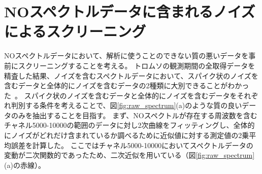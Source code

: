 \section{NOスペクトルデータに含まれるノイズによるスクリーニング}
\label{sec:screening_spectralnoise}

NOスペクトルデータにおいて、解析に使うことのできない質の悪いデータを事前にスクリーニングすることを考える。
トロムソの観測期間の全取得データを精査した結果、ノイズを含むスペクトルデータにおいて、スパイク状のノイズを含むデータと全体的にノイズを含むデータの2種類に大別できることがわかった~\cite{goto2021bachelor}。
スパイク状のノイズを含むデータと全体的にノイズを含むデータをそれぞれ判別する条件を考えることで、図\ref{fig:raw_spectrum}(a)のような質の良いデータのみを抽出することを目指す。
まず、NOスペクトルが存在する周波数を含むチャネル5000-10000の範囲のデータに対し2次曲線をフィッティングし、全体的にノイズがどれだけ含まれているか調べるために近似値に対する測定値の2乗平均誤差を計算した。
ここではチャネル5000-10000においてスペクトルデータの変動が二次関数的であったため、二次近似を用いている（図\ref{fig:raw_spectrum}(a)の赤線）。
